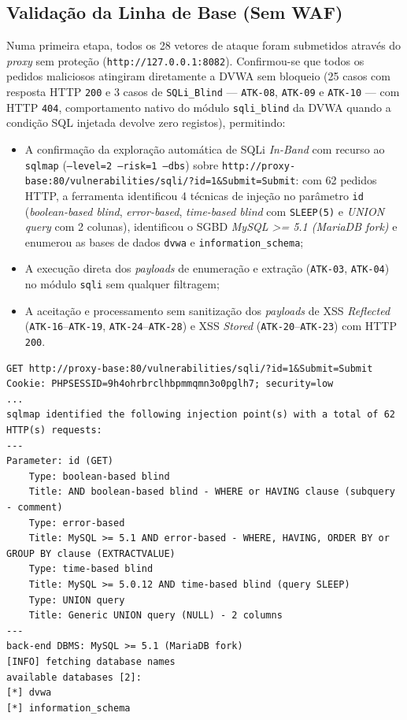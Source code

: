 \documentclass[11pt,a4paper]{article}
\begin{document}
\subsection{Validação da Linha de Base (Sem WAF)}
Numa primeira etapa, todos os 28 vetores de ataque foram submetidos através do \textit{proxy} sem proteção (\texttt{http://127.0.0.1:8082}). Confirmou-se que todos os pedidos maliciosos atingiram diretamente a DVWA sem bloqueio (25 casos com resposta HTTP \texttt{200} e 3 casos de \texttt{SQLi\_Blind} --- \texttt{ATK-08}, \texttt{ATK-09} e \texttt{ATK-10} --- com HTTP \texttt{404}, comportamento nativo do módulo \texttt{sqli\_blind} da DVWA quando a condição SQL injetada devolve zero registos), permitindo:
\begin{itemize}
    \item A confirmação da exploração automática de SQLi \textit{In-Band} com recurso ao \texttt{sqlmap} (\texttt{--level=2 --risk=1 --dbs}) sobre \texttt{http://proxy-base:80/vulnerabilities/sqli/?id=1\&Submit=Submit}: com 62 pedidos HTTP, a ferramenta identificou 4 técnicas de injeção no parâmetro \texttt{id} (\textit{boolean-based blind}, \textit{error-based}, \textit{time-based blind} com \texttt{SLEEP(5)} e \textit{UNION query} com 2 colunas), identificou o SGBD \textit{MySQL >= 5.1 (MariaDB fork)} e enumerou as bases de dados \texttt{dvwa} e \texttt{information\_schema};
    \item A execução direta dos \textit{payloads} de enumeração e extração (\texttt{ATK-03}, \texttt{ATK-04}) no módulo \texttt{sqli} sem qualquer filtragem;
    \item A aceitação e processamento sem sanitização dos \textit{payloads} de XSS \textit{Reflected} (\texttt{ATK-16}--\texttt{ATK-19}, \texttt{ATK-24}--\texttt{ATK-28}) e XSS \textit{Stored} (\texttt{ATK-20}--\texttt{ATK-23}) com HTTP \texttt{200}.
\end{itemize}

\begin{lstlisting}[caption={Excerto da execução do \texttt{sqlmap} contra o \textit{Baseline} (\texttt{proxy-base:80}), comprovando a exploração bem-sucedida da DVWA.},label={lst:sqlmap_baseline}]
GET http://proxy-base:80/vulnerabilities/sqli/?id=1&Submit=Submit
Cookie: PHPSESSID=9h4ohrbrclhbpmmqmn3o0pglh7; security=low
...
sqlmap identified the following injection point(s) with a total of 62 HTTP(s) requests:
---
Parameter: id (GET)
    Type: boolean-based blind
    Title: AND boolean-based blind - WHERE or HAVING clause (subquery - comment)
    Type: error-based
    Title: MySQL >= 5.1 AND error-based - WHERE, HAVING, ORDER BY or GROUP BY clause (EXTRACTVALUE)
    Type: time-based blind
    Title: MySQL >= 5.0.12 AND time-based blind (query SLEEP)
    Type: UNION query
    Title: Generic UNION query (NULL) - 2 columns
---
back-end DBMS: MySQL >= 5.1 (MariaDB fork)
[INFO] fetching database names
available databases [2]:
[*] dvwa
[*] information_schema
\end{lstlisting}
\end{document}
